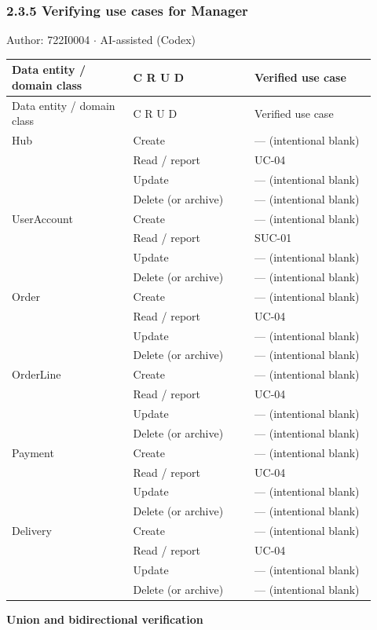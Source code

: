 \subsubsection*{2.3.5 Verifying use cases for Manager}
Author: 722I0004 \ensuremath{\cdot} AI-assisted (Codex)

\begin{longtable}{>{\raggedright\arraybackslash}p{0.3067\linewidth}>{\raggedright\arraybackslash}p{0.3067\linewidth}>{\raggedright\arraybackslash}p{0.3067\linewidth}}
Data entity / domain class & C R U D & Verified use case \\
\hline\endfirsthead
Data entity / domain class & C R U D & Verified use case \\
\hline\endhead
Hub & Create & --- (intentional blank) \\
 & Read / report & UC-04 \\
 & Update & --- (intentional blank) \\
 & Delete (or archive) & --- (intentional blank) \\
UserAccount & Create & --- (intentional blank) \\
 & Read / report & SUC-01 \\
 & Update & --- (intentional blank) \\
 & Delete (or archive) & --- (intentional blank) \\
Order & Create & --- (intentional blank) \\
 & Read / report & UC-04 \\
 & Update & --- (intentional blank) \\
 & Delete (or archive) & --- (intentional blank) \\
OrderLine & Create & --- (intentional blank) \\
 & Read / report & UC-04 \\
 & Update & --- (intentional blank) \\
 & Delete (or archive) & --- (intentional blank) \\
Payment & Create & --- (intentional blank) \\
 & Read / report & UC-04 \\
 & Update & --- (intentional blank) \\
 & Delete (or archive) & --- (intentional blank) \\
Delivery & Create & --- (intentional blank) \\
 & Read / report & UC-04 \\
 & Update & --- (intentional blank) \\
 & Delete (or archive) & --- (intentional blank) \\
\end{longtable}
\textbf{Union and bidirectional verification}

